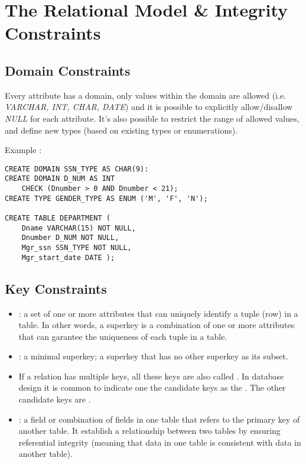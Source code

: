 \chapter{The Relational Model \& Integrity Constraints}

\section{Domain Constraints}

Every attribute has a domain, only values within the domain are allowed (i.e. \textit{VARCHAR, INT, CHAR, DATE}) and it is possible to explicitly allow/disallow \textit{NULL} for each attribute. It's also possible to restrict the range of allowed values, and define new types (based on existing types or enumerations).

Example :

\begin{verbatim}
CREATE DOMAIN SSN_TYPE AS CHAR(9):
CREATE DOMAIN D_NUM AS INT
    CHECK (Dnumber > 0 AND Dnumber < 21);
CREATE TYPE GENDER_TYPE AS ENUM ('M', 'F', 'N');

CREATE TABLE DEPARTMENT (
    Dname VARCHAR(15) NOT NULL,
    Dnumber D_NUM NOT NULL,
    Mgr_ssn SSN_TYPE NOT NULL,
    Mgr_start_date DATE );
\end{verbatim}

\section{Key Constraints}

\begin{itemize}
    \item {} : a set of one or more attributes that can uniquely identify a tuple (row) in a table. In other words, a superkey is a combination of one or more attributes that can garantee the uniqueness of each tuple in a table.
    \item {} : a minimal superkey; a superkey that has no other superkey as its subset.
    \item If a relation has multiple keys, all these keys are also called . In database design it is common to indicate one the candidate keys as the . The other candidate keys are .
    \item {} : a field or combination of fields in one table that refers to the primary key of another table. It establish a relationship between two tables by ensuring referential integrity (meaning that data in one table is consistent with data in another table).
\end{itemize}

